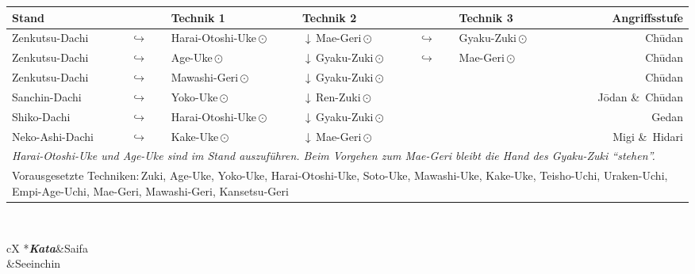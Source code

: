 \begin{tcolorbox}[colframe=BLBELT,colback=white,coltitle=white,title=4. Kyu:\indent Kihon-Ido Kata - Partnerformen - Erwartungshorizont]
\null\vfill\null
{}
	\begin{tabularx}{\textwidth}{lllllXr}
		\textbf{Stand} 	&  	& \textbf{Technik 1} & \textbf{Technik 2} & &\textbf{Technik 3}& \textbf{Angriffsstufe}\\
		\midrule
		Zenkutsu-Dachi 	& \(\hookrightarrow\)	& Harai-Otoshi-Uke\,\(\odot\) 	& \(\downarrow\)\,Mae-Geri\,\(\odot\)	& \(\hookrightarrow\) 	& Gyaku-Zuki\,\(\odot\)	& Ch\={u}dan \\
		Zenkutsu-Dachi 	& \(\hookrightarrow\)	& Age-Uke\,\(\odot\) 			& \(\downarrow\)\,Gyaku-Zuki\,\(\odot\) & \(\hookrightarrow\)	& Mae-Geri\,\(\odot\)	& Ch\={u}dan \\
		Zenkutsu-Dachi 	& \(\hookrightarrow\)	& Mawashi-Geri\,\(\odot\) 		& \(\downarrow\)\,Gyaku-Zuki\,\(\odot\) 				&						&	 					& Ch\={u}dan \\
		Sanchin-Dachi 	& \(\hookrightarrow\)	& Yoko-Uke\,\(\odot\) 			& \(\downarrow\)\,Ren-Zuki\,\(\odot\) 					&						& 						& J\={o}dan \&~Ch\={u}dan \\
		Shiko-Dachi 	& \(\hookrightarrow\)	& Harai-Otoshi-Uke\,\(\odot\) 	& \(\downarrow\)\,Gyaku-Zuki\,\(\odot\) 				&						& 						& Gedan \\
		Neko-Ashi-Dachi	& \(\hookrightarrow\)	& Kake-Uke\,\(\odot\) 			& \(\downarrow\)\,Mae-Geri\,\(\odot\) 					&						& 						& Migi \&~Hidari  \\
		\multicolumn{7}{l}{{\scriptsize \textit{Harai-Otoshi-Uke und Age-Uke sind im Stand auszuführen. Beim Vorgehen zum Mae-Geri bleibt die Hand des Gyaku-Zuki \textquotedblleft{stehen}\textquotedblright .}}}\\
		\midrule
		\multicolumn{7}{p{\linewidth-2\tabcolsep}}{{\footnotesize Vorausgesetzte Techniken:\,Zuki, Age-Uke, Yoko-Uke, Harai-Otoshi-Uke, Soto-Uke, Mawashi-Uke, Kake-Uke, Teisho-Uchi, Uraken-Uchi, Empi-Age-Uchi, Mae-Geri, Mawashi-Geri, Kansetsu-Geri}}\\
		\midrule
	\end{tabularx}\\
	\null\vfill\null
	\begin{minipage}[t]{0.45\textwidth}
		\begin{tabularx}{\textwidth}{cX}
			\midrule
			*{\textbf{\textit{Kata}}}&Saifa\\
			&Seeinchin \\

\end{tabularx}
\end{minipage}
\end{tcolorbox}
